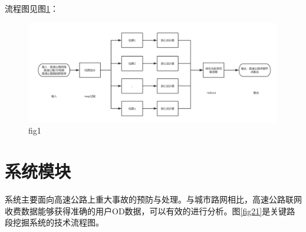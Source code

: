 		流程图见图\ref{mapreduce}：
		\begin{figure}[h]
		\centering
				\begin{minipage}{0.8\linewidth}
					\centering
					\includegraphics[width=4.4in]{picture/mapreduce}
					\caption{fig1}
					\label{mapreduce}
				\end{minipage}%
		\end{figure}

	\section{系统模块}

		系统主要面向高速公路上重大事故的预防与处理。与城市路网相比，高速公路联网收费数据能够获得准确的用户OD数据，可以有效的进行分析。图\ref{fig21}是关键路段挖掘系统的技术流程图。

